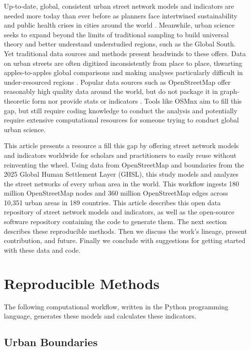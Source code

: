 \documentclass[12pt,letterpaper]{article} %
\begin{document}
Up-to-date, global, consistent urban street network models and indicators are needed more today than ever before as planners face intertwined sustainability and public health crises in cities around the world \citep{giles-corti_creating_2022}. Meanwhile, urban science seeks to expand beyond the limits of traditional sampling to build universal theory and better understand understudied regions, such as the Global South. Yet traditional data sources and methods present headwinds to these offers. Data on urban streets are often digitized inconsistently from place to place, thwarting apples-to-apples global comparisons and making analyses particularly difficult in under-resourced regions \citep{liu_generalized_2022}. Popular data sources such as OpenStreetMap offer reasonably high quality data around the world, but do not package it in graph-theoretic form nor provide stats or indicators \citep{boeing_modeling_2025}. Tools like OSMnx aim to fill this gap, but still require coding knowledge to conduct the analysis and potentially require extensive computational resources for someone trying to conduct global urban science.

This article presents a resource a fill this gap by offering street network models and indicators worldwide for scholars and practitioners to easily reuse without reinventing the wheel. Using data from OpenStreetMap and boundaries from the 2025 Global Human Settlement Layer (GHSL), this study models and analyzes the street networks of every urban area in the world. This workflow ingests 180 million OpenStreetMap nodes and 360 million OpenStreetMap edges across 10,351 urban areas in 189 countries. This article describes this open data repository of street network models and indicators, as well as the open-source software repository containing the code to generate them. The next section describes these reproducible methods. Then we discuss the work's lineage, present contribution, and future. Finally we conclude with suggestions for getting started with these data and code.

\section{Reproducible Methods}

The following computational workflow, written in the Python programming language, generates these models and calculates these indicators.

\subsection{Urban Boundaries}
\end{document}
